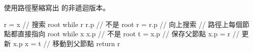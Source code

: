 \startEXERCISE
使用路徑壓縮寫出  的非遞迴版本。
\stopEXERCISE

\startANSWER
{}
\startCLRSCODE
r = x
// 搜索 root
while r \ne r.p	// 不是 root
	r = r.p	// 向上搜索
// 路徑上每個節點都直接指向 root
while x \ne x.p	// 不是 root
	t = x.p	// 保存父節點
	x.p = r	// 更新 x.p
	x = t	// 移動到父節點
return r
\stopCLRSCODE
\stopANSWER
